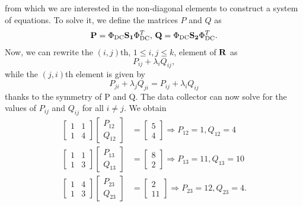 \documentclass{article}
\begin{document}
from which we are interested in the non-diagonal elements to construct a system of equations. To solve it, we define the matrices $P$ and $Q$ as
\begin{align*}
\vb{P} = \Phi_{\text{DC}}\vb{S_1} \Phi_{\text{DC}}^T \text{, }
\vb{Q} = \Phi_{\text{DC}}\vb{S_2} \Phi_{\text{DC}}^T .
\end{align*}
Now, we can rewrite the $(i, j)$th, $1 \leq i, j\leq k$, element of $\vb{R}$ as
\begin{equation*}
P_{ij} + \lambda_iQ_{ij},
\end{equation*}
while the $(j,i)$th element is given by
\begin{equation*}
P_{ji} + \lambda_jQ_{ji} = P_{ij} + \lambda_iQ_{ij}
\end{equation*}
thanks to the symmetry of P and Q. The data collector can now solve for the values of $P_{ij}$ and $Q_{ij}$ for all $i \neq j$. We obtain
\begin{align*}
\begin{bmatrix}
1 & 1\\
1 & 4
\end{bmatrix}
\begin{bmatrix}
P_{12}\\
Q_{12}
\end{bmatrix}
&=
\begin{bmatrix}
5\\
4
\end{bmatrix}
\Rightarrow
P_{12}=1, Q_{12}=4\\
\begin{bmatrix}
1 & 1\\
1 & 3
\end{bmatrix}
\begin{bmatrix}
P_{13}\\
Q_{13}
\end{bmatrix}
&=
\begin{bmatrix}
8\\
2
\end{bmatrix}
\Rightarrow
P_{13}=11, Q_{13}=10\\
\begin{bmatrix}
1 & 4\\
1 & 3
\end{bmatrix}
\begin{bmatrix}
P_{23}\\
Q_{23}
\end{bmatrix}
&=
\begin{bmatrix}
2\\
11
\end{bmatrix}
\Rightarrow
P_{23}=12, Q_{23}=4.
\end{align*}
\end{document}
